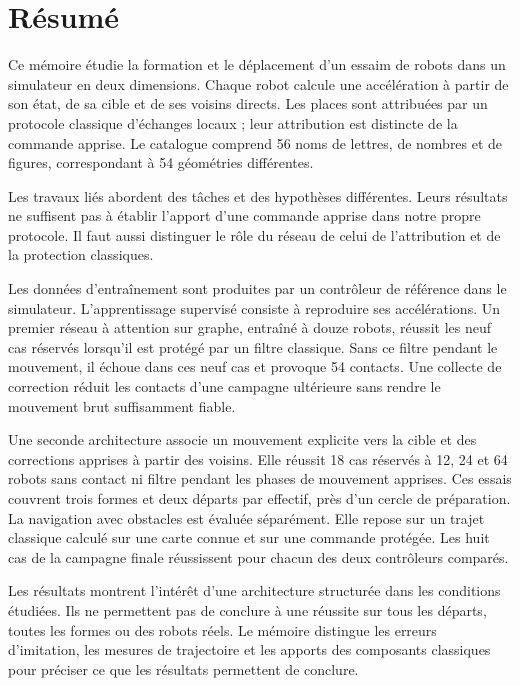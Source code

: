 \cleardoublepage
{}
\listoffigures
\cleardoublepage
{}
\listoftables

\chapter*{Résumé}
Ce mémoire étudie la formation et le déplacement d'un essaim de robots dans un simulateur en deux dimensions. Chaque robot calcule une accélération à partir de son état, de sa cible et de ses voisins directs. Les places sont attribuées par un protocole classique d'échanges locaux ; leur attribution est distincte de la commande apprise. Le catalogue comprend 56 noms de lettres, de nombres et de figures, correspondant à 54 géométries différentes.

Les travaux liés abordent des tâches et des hypothèses différentes. Leurs résultats ne suffisent pas à établir l'apport d'une commande apprise dans notre propre protocole. Il faut aussi distinguer le rôle du réseau de celui de l'attribution et de la protection classiques.

Les données d'entraînement sont produites par un contrôleur de référence dans le simulateur. L'apprentissage supervisé consiste à reproduire ses accélérations. Un premier réseau à attention sur graphe, entraîné à douze robots, réussit les neuf cas réservés lorsqu'il est protégé par un filtre classique. Sans ce filtre pendant le mouvement, il échoue dans ces neuf cas et provoque 54 contacts. Une collecte de correction réduit les contacts d'une campagne ultérieure sans rendre le mouvement brut suffisamment fiable.

Une seconde architecture associe un mouvement explicite vers la cible et des corrections apprises à partir des voisins. Elle réussit 18 cas réservés à 12, 24 et 64 robots sans contact ni filtre pendant les phases de mouvement apprises. Ces essais couvrent trois formes et deux départs par effectif, près d'un cercle de préparation. La navigation avec obstacles est évaluée séparément. Elle repose sur un trajet classique calculé sur une carte connue et sur une commande protégée. Les huit cas de la campagne finale réussissent pour chacun des deux contrôleurs comparés.

Les résultats montrent l'intérêt d'une architecture structurée dans les conditions étudiées. Ils ne permettent pas de conclure à une réussite sur tous les départs, toutes les formes ou des robots réels. Le mémoire distingue les erreurs d'imitation, les mesures de trajectoire et les apports des composants classiques pour préciser ce que les résultats permettent de conclure.

